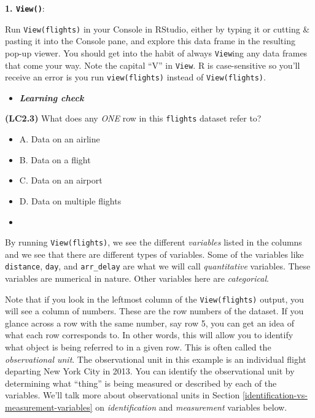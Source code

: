 \documentclass[12pt, krantz2,]{krantz}
\providecommand{\tightlist}{%
  \setlength{\itemsep}{0pt}\setlength{\parskip}{0pt}}
\newenvironment{rmdblock}[1]
  {\begin{shaded*}
  \begin{itemize}
  \renewcommand{\labelitemi}{
    \raisebox{-.7\height}[0pt][0pt]{
    }
  }
  \item
  }
  {
  \end{itemize}
  \end{shaded*}
  }
\newenvironment{learncheck}
  {\begin{rmdblock}{warning}}
  {\end{rmdblock}}
\begin{document}
\textbf{1. \texttt{View()}}:

Run \texttt{View(flights)} in your Console in RStudio, either by typing it or cutting \& pasting it into the Console pane, and explore this data frame in the resulting pop-up viewer. You should get into the habit of always \texttt{View}ing any data frames that come your way. Note the capital ``V'' in \texttt{View}. R is case-sensitive so you'll receive an error is you run \texttt{view(flights)} instead of \texttt{View(flights)}.

\begin{learncheck}
\textbf{\emph{Learning check}}
\end{learncheck}

\textbf{(LC2.3)} What does any \emph{ONE} row in this \texttt{flights} dataset refer to?

\begin{itemize}
\tightlist
\item
  A. Data on an airline
\item
  B. Data on a flight
\item
  C. Data on an airport
\item
  D. Data on multiple flights
\end{itemize}

\begin{learncheck}

\end{learncheck}

By running \texttt{View(flights)}, we see the different \emph{variables} listed in the columns and we see that there are different types of variables. Some of the variables like \texttt{distance}, \texttt{day}, and \texttt{arr\_delay} are what we will call \emph{quantitative} variables. These variables are numerical in nature. Other variables here are \emph{categorical}.

Note that if you look in the leftmost column of the \texttt{View(flights)} output, you will see a column of numbers. These are the row numbers of the dataset. If you glance across a row with the same number, say row 5, you can get an idea of what each row corresponds to. In other words, this will allow you to identify what object is being referred to in a given row. This is often called the \emph{observational unit}. The observational unit in this example is an individual flight departing New York City in 2013. You can identify the observational unit by determining what ``thing'' is being measured or described by each of the variables. We'll talk more about observational units in Section \ref{identification-vs-measurement-variables} on \emph{identification} and \emph{measurement} variables below.
\end{document}
